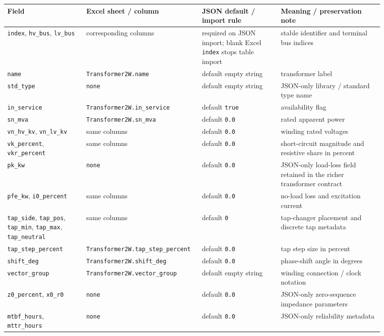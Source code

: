 \begin{longtable}{L{0.20\linewidth}L{0.24\linewidth}L{0.20\linewidth}L{0.26\linewidth}}
\toprule
Field & Excel sheet / column & JSON default / import rule & Meaning / preservation note \\
\midrule
\endhead
\texttt{index}, \texttt{hv\_bus}, \texttt{lv\_bus} & corresponding columns & required on JSON import; blank Excel \texttt{index} stops table import & stable identifier and terminal bus indices \\
\texttt{name} & \texttt{Transformer2W.name} & default empty string & transformer label \\
\texttt{std\_type} & \texttt{none} & default empty string & JSON-only library / standard type name \\
\texttt{in\_service} & \texttt{Transformer2W.in\_service} & default \texttt{true} & availability flag \\
\texttt{sn\_mva} & \texttt{Transformer2W.sn\_mva} & default \texttt{0.0} & rated apparent power \\
\texttt{vn\_hv\_kv}, \texttt{vn\_lv\_kv} & same columns & default \texttt{0.0} & winding rated voltages \\
\texttt{vk\_percent}, \texttt{vkr\_percent} & same columns & default \texttt{0.0} & short-circuit magnitude and resistive share in percent \\
\texttt{pk\_kw} & \texttt{none} & default \texttt{0.0} & JSON-only load-loss field retained in the richer transformer contract \\
\texttt{pfe\_kw}, \texttt{i0\_percent} & same columns & default \texttt{0.0} & no-load loss and excitation current \\
\texttt{tap\_side}, \texttt{tap\_pos}, \texttt{tap\_min}, \texttt{tap\_max}, \texttt{tap\_neutral} & same columns & default \texttt{0} & tap-changer placement and discrete tap metadata \\
\texttt{tap\_step\_percent} & \texttt{Transformer2W.tap\_step\_percent} & default \texttt{0.0} & tap step size in percent \\
\texttt{shift\_deg} & \texttt{Transformer2W.shift\_deg} & default \texttt{0.0} & phase-shift angle in degrees \\
\texttt{vector\_group} & \texttt{Transformer2W.vector\_group} & default empty string & winding connection / clock notation \\
\texttt{z0\_percent}, \texttt{x0\_r0} & \texttt{none} & default \texttt{0.0} & JSON-only zero-sequence impedance parameters \\
\texttt{mtbf\_hours}, \texttt{mttr\_hours} & \texttt{none} & default \texttt{0.0} & JSON-only reliability metadata \\
\bottomrule
\end{longtable}

